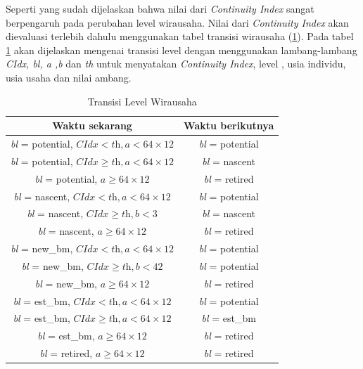 Seperti yang sudah dijelaskan bahwa nilai dari \textit{Continuity Index} sangat berpengaruh pada perubahan level wirausaha. Nilai dari \textit{Continuity Index} akan dievaluasi terlebih dahulu menggunakan tabel transisi wirausaha (\ref{tabelLW}). Pada tabel \ref{tabelLW} akan dijelaskan mengenai transisi level dengan menggunakan lambang-lambang \textit{CIdx, bl, a ,b} dan \textit{th} untuk menyatakan \textit{Continuity Index}, level , usia individu, usia usaha dan nilai ambang.
\begin{table}[H]
\centering
\caption{Transisi Level Wirausaha}
\begin{tabular}{|c|c|}
\hline
Waktu sekarang & Waktu berikutnya \\
\hline
\textit{bl} = potential, $ \textit{CIdx} < \textit{th}, \textit{a} < 64 \times 12$ & \textit{bl} = potential \\
\hline
\textit{bl} = potential, $\textit{CIdx} \geq \textit{th}, \textit{a} < 64 \times 12$ & \textit{bl} = nascent \\
\hline
\textit{bl} = potential, $\textit{a} \geq 64 \times 12$ & \textit{bl} = retired \\
\hline
\textit{bl} = nascent, $\textit{CIdx} < \textit{th}, \textit{a} <64 \times 12$ & \textit{bl} = potential \\
\hline
\textit{bl} = nascent, $\textit{CIdx} \geq \textit{th}, \textit{b} < 3$ & \textit{bl} = nascent \\
\hline
\textit{bl} = nascent, $\textit{a} \geq 64 \times 12$ & \textit{bl} = retired \\
\hline
\textit{bl} = new\_bm, $\textit{CIdx} < \textit{th}, \textit{a} < 64 \times 12$ & \textit{bl} = potential \\
\hline
\textit{bl} = new\_bm, $\textit{CIdx} \geq \textit{th}, \textit{b} < 42$ & \textit{bl} = potential \\
\hline
\textit{bl} = new\_bm, $\textit{a} \geq 64 \times 12$ & \textit{bl} = retired \\
\hline
\textit{bl} = est\_bm, $\textit{CIdx} < \textit{th}, \textit{a} < 64 \times 12$ & \textit{bl} = potential \\
\hline
\textit{bl} = est\_bm, $\textit{CIdx} \geq \textit{th}, \textit{a} < 64 \times 12$ & \textit{bl} = est\_bm \\
\hline
\textit{bl} = est\_bm, $\textit{a} \geq 64 \times 12$ & \textit{bl} = retired \\
\hline
\textit{bl} = retired, $\textit{a} \geq 64 \times 12$ & \textit{bl} = retired \\
\hline
\end{tabular}
\label{tabelLW}
\end{table}


